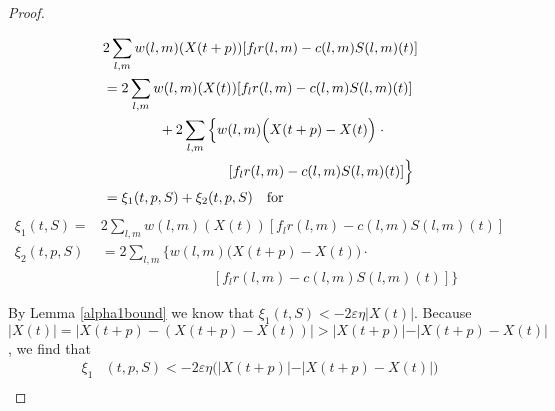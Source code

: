 \begin{proof}
\begin{small}
\begin{align} \nonumber 
&2\sum_{l,m} w(l,m)(X(t + p)) [f_{l}  r(l,m) -  c(l,m)S(l,m)(t) ]     \\ \nonumber
&=  2\sum_{l,m} w(l,m)(X(t )) [f_{l}r(l,m) - c(l,m)S(l,m)(t) ]  \\ \nonumber
& \qquad  \qquad + 2\sum_{l,m} \Big\{w(l,m) \Big( X(t + p) - X(t) \Big)\; \cdot  \\ 
& \qquad \qquad \qquad \qquad \quad [f_{l}r(l,m) - c(l,m)S(l,m)(t) ] \Big\} \\  
&=  \xi_{1} (t,p,S)+  \xi_{2} (t,p,S) \text{\quad for} \nonumber
\end{align}
\begin{align*} 
\xi_{1} (t,S) = &2\sum_{l,m} w(l,m)(X(t)) [f_{l}r(l,m) - c(l,m)S(l,m)(t) ]  \\
\xi_{2} (t,p,S) &= 2\sum_{l,m} \Big\{w(l,m) \Big( X(t + p) - X(t) \Big) \cdot  \\ 
& \qquad \qquad \qquad \qquad [f_{l}r(l,m) - c(l,m)S(l,m)(t) ] \Big\} 
\end{align*}
\end{small}By Lemma \ref{alpha1bound} we know that 
$
\xi_1(t,S) < -2\varepsilon \eta \vert X(t) \vert
$. Because $
\vert X(t) \vert = \vert X(t + p) - (X(t + p) - X(t)) \vert
>  \vert X(t + p) \vert - \vert  X(t + p) - X(t)   \vert$, 
we find that
\begin{align} \nonumber
\xi_1 &(t,p,S) < -2\varepsilon \eta \big( \vert X(t + p) \vert -  \vert  X(t + p) - X(t)   \vert \big)\\ \nonumber

\end{align}
\end{proof}
